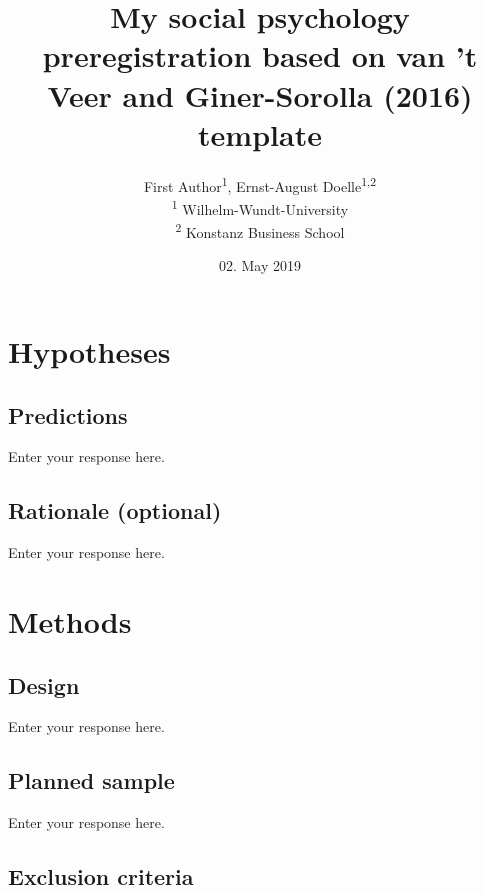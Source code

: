 \documentclass[]{article}
\title{My social psychology preregistration based on van 't Veer and
Giner-Sorolla (2016) template}
\author{
          First Author\textsuperscript{1},
          Ernst-August Doelle\textsuperscript{1,2}          \\ \vspace{0.5cm}
              \textsuperscript{1} Wilhelm-Wundt-University\\
              \textsuperscript{2} Konstanz Business School      }
\date{02. May 2019}
\newcounter{question}
\begin{document}
\maketitle
\vspace{2pc}


\newcommand\Question[2]{%
   \leavevmode\par
   \stepcounter{question}
   \noindent
   \textbf{\thequestion. #1}. #2\par}

\newcommand\Answer[1]{%
    \noindent
    \textit{Registered response}: #1\par}
    
\hypertarget{hypotheses}{%
\section{Hypotheses}\label{hypotheses}}

\hypertarget{predictions}{%
\subsection{Predictions}\label{predictions}}

Enter your response here.

\hypertarget{rationale-optional}{%
\subsection{Rationale (optional)}\label{rationale-optional}}

Enter your response here.

\hypertarget{methods}{%
\section{Methods}\label{methods}}

\hypertarget{design}{%
\subsection{Design}\label{design}}

Enter your response here.

\hypertarget{planned-sample}{%
\subsection{Planned sample}\label{planned-sample}}

Enter your response here.

\hypertarget{exclusion-criteria}{%
\subsection{Exclusion criteria}\label{exclusion-criteria}}
\end{document}
